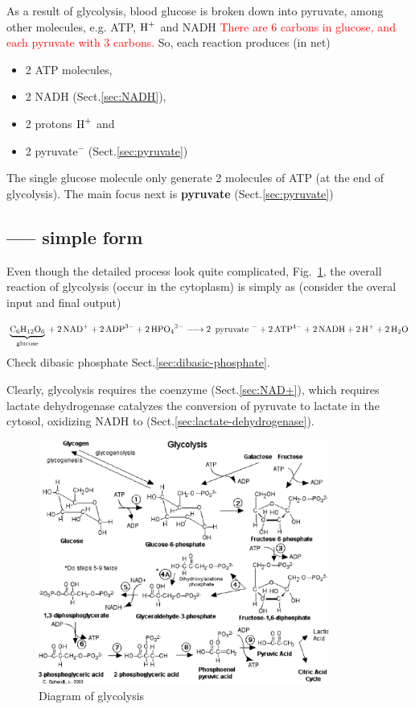 As a result of glycolysis, blood glucose is broken down into  pyruvate, among
other molecules, e.g. ATP, $\ce{H+}$ and NADH
 \textcolor{red}{There are 6 carbons in
glucose, and each pyruvate with 3 carbons.} So, each reaction produces (in net)
\begin{itemize}
  \item 2 ATP molecules,
  \item 2 NADH (Sect.\ref{sec:NADH}),
  \item 2 protons $\ce{H+}$ and
  \item 2 pyruvate$^{-}$  (Sect.\ref{sec:pyruvate})
\end{itemize}
The single glucose molecule only generate 2 molecules of ATP (at the end of
glycolysis). The main focus next is {\bf pyruvate} (Sect.\ref{sec:pyruvate})


\subsection{----- simple form}
\label{sec:glycolysis-simple-form}

Even though the detailed process look quite complicated,
Fig.~\ref{fig:glycolysis}, the overall reaction of glycolysis (occur in the
cytoplasm) is simply as (consider the overal input and final output)

{\tiny
\begin{equation}
  \label{eq:6}
  \underbrace{\ce{C6H12O6}}_\text{glucose} \ce{ + 2 NAD^+ + 2 ADP^{3-} + 2
  HPO_4^{2-} -> 2
  \text{ pyruvate }$^{-}$ + 2 ATP$^{4-}$ + 2 NADH + 2 H$^{+}$ + 2 \ce{H2O}}
\end{equation}
}
Check dibasic phosphate  Sect.\ref{sec:dibasic-phosphate}.

Clearly, glycolysis requires the coenzyme  (Sect.\ref{sec:NAD+}),
which requires  lactate dehydrogenase catalyzes the conversion of pyruvate to
lactate in the cytosol, oxidizing NADH to 
(Sect.\ref{sec:lactate-dehydrogenase}).


\begin{figure}[hbt]
  \centerline{\includegraphics[height=8cm,
    angle=0]{./images/glycolysis.eps}}
\caption{Diagram of glycolysis}
\label{fig:glycolysis}
\end{figure}

